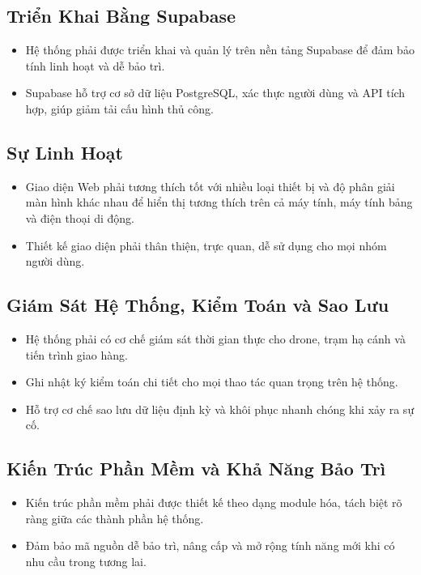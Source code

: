 \subsection{Triển Khai Bằng Supabase}
\begin{itemize}
  \item Hệ thống phải được triển khai và quản lý trên nền tảng Supabase để đảm bảo tính linh hoạt và dễ bảo trì.
  \item Supabase hỗ trợ cơ sở dữ liệu PostgreSQL, xác thực người dùng và API tích hợp, giúp giảm tải cấu hình thủ công.
\end{itemize}

\subsection{Sự Linh Hoạt}
\begin{itemize}
  \item Giao diện Web phải tương thích tốt với nhiều loại thiết bị và độ phân giải màn hình khác nhau để hiển thị tương thích trên cả máy tính, máy tính bảng và điện thoại di động.
  \item Thiết kế giao diện phải thân thiện, trực quan, dễ sử dụng cho mọi nhóm người dùng.
\end{itemize}

\subsection{Giám Sát Hệ Thống, Kiểm Toán và Sao Lưu}
\begin{itemize}
  \item Hệ thống phải có cơ chế giám sát thời gian thực cho drone, trạm hạ cánh và tiến trình giao hàng.
  \item Ghi nhật ký kiểm toán chi tiết cho mọi thao tác quan trọng trên hệ thống.
  \item Hỗ trợ cơ chế sao lưu dữ liệu định kỳ và khôi phục nhanh chóng khi xảy ra sự cố.
\end{itemize}

\subsection{Kiến Trúc Phần Mềm và Khả Năng Bảo Trì}
\begin{itemize}
  \item Kiến trúc phần mềm phải được thiết kế theo dạng module hóa, tách biệt rõ ràng giữa các thành phần hệ thống.
  \item Đảm bảo mã nguồn dễ bảo trì, nâng cấp và mở rộng tính năng mới khi có nhu cầu trong tương lai.
\end{itemize}

